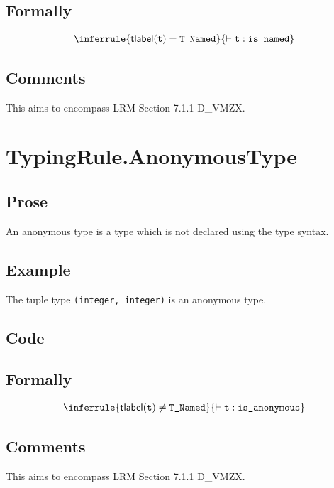 \documentclass{book}
\newcommand\typelabel[0]{\textsf{tlabel}} %
\newcommand\isnamed[0]{\texttt{is\_named}}
\newcommand\isanonymous[0]{\texttt{is\_anonymous}}
\newcommand\vt[0]{\texttt{t}}
\begin{document}
\begin{formal}
      \subsection{Formally}
\[
\begin{array}{c}
\inferrule{\typelabel(\vt) = \TNamed}{\entails \vt : \isnamed}
\end{array}
\]
\end{formal}

    \subsection{Comments}
    This aims to encompass LRM Section 7.1.1 D\_VMZX.

\section{TypingRule.AnonymousType \label{sec:TypingRule.AnonymousType}}

    \subsection{Prose} 
    An anonymous type is a type which is not declared using the type syntax. 

    \subsection{Example}
    The tuple type \texttt{(integer, integer)} is an anonymous type.

    \subsection{Code}

\begin{formal}
      \subsection{Formally}
\[
\begin{array}{c}
\inferrule{\typelabel(\vt) \neq \TNamed}{\entails \vt : \isanonymous}
\end{array}
\]
\end{formal}

    \subsection{Comments}
    This aims to encompass LRM Section 7.1.1 D\_VMZX.
\end{document}
